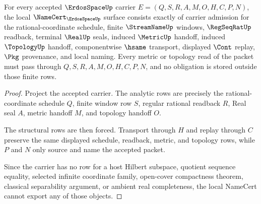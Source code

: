 \begin{theorem}
\label{thm:erdos-space-namecert-obligations}
For every accepted $\ErdosSpaceUp$ carrier $E=(Q,S,R,A,M,O,H,C,P,N)$, the local $\NameCert_{\ErdosSpaceUp}$ surface consists exactly of carrier admission for the rational-coordinate schedule, finite $\StreamNameUp$ windows, $\RegSeqRatUp$ readback, terminal $\RealUp$ seals, induced $\MetricUp$ handoff, induced $\TopologyUp$ handoff, componentwise $\hsame$ transport, displayed $\Cont$ replay, $\Pkg$ provenance, and local naming. Every metric or topology read of the packet must pass through $Q,S,R,A,M,O,H,C,P,N$, and no obligation is stored outside those finite rows.
\end{theorem}
\begin{proof}
Project the accepted carrier. The analytic rows are precisely the rational-coordinate schedule $Q$, finite window row $S$, regular rational readback $R$, Real seal $A$, metric handoff $M$, and topology handoff $O$.

The structural rows are then forced. Transport through $H$ and replay through $C$ preserve the same displayed schedule, readback, metric, and topology rows, while $P$ and $N$ only source and name the accepted packet.

Since the carrier has no row for a host Hilbert subspace, quotient sequence equality, selected infinite coordinate family, open-cover compactness theorem, classical separability argument, or ambient real completeness, the local NameCert cannot export any of those objects.
\end{proof}


